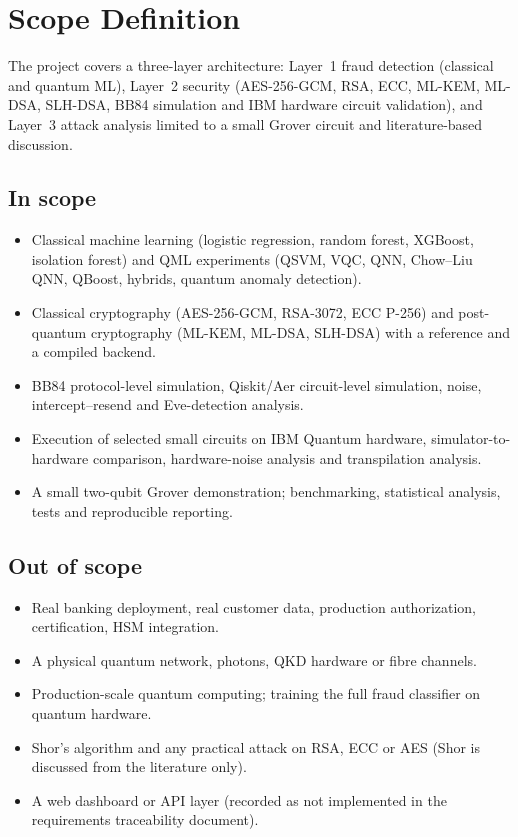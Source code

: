 \section{Scope Definition}
The project covers a three-layer architecture: Layer~1 fraud detection (classical and quantum ML), Layer~2 security (AES-256-GCM, RSA, ECC, ML-KEM, ML-DSA, SLH-DSA, BB84 simulation and IBM hardware circuit validation), and Layer~3 attack analysis limited to a small Grover circuit and literature-based discussion.

\subsection*{In scope}
\begin{itemize}[noitemsep]
\item Classical machine learning (logistic regression, random forest, XGBoost, isolation forest) and QML experiments (QSVM, VQC, QNN, Chow--Liu QNN, QBoost, hybrids, quantum anomaly detection).
\item Classical cryptography (AES-256-GCM, RSA-3072, ECC P-256) and post-quantum cryptography (ML-KEM, ML-DSA, SLH-DSA) with a reference and a compiled backend.
\item BB84 protocol-level simulation, Qiskit/Aer circuit-level simulation, noise, intercept--resend and Eve-detection analysis.
\item Execution of selected small circuits on IBM Quantum hardware, simulator-to-hardware comparison, hardware-noise analysis and transpilation analysis.
\item A small two-qubit Grover demonstration; benchmarking, statistical analysis, tests and reproducible reporting.
\end{itemize}

\subsection*{Out of scope}
\begin{itemize}[noitemsep]
\item Real banking deployment, real customer data, production authorization, certification, HSM integration.
\item A physical quantum network, photons, QKD hardware or fibre channels.
\item Production-scale quantum computing; training the full fraud classifier on quantum hardware.
\item Shor's algorithm and any practical attack on RSA, ECC or AES (Shor is discussed from the literature only).
\item A web dashboard or API layer (recorded as not implemented in the requirements traceability document).
\end{itemize}

